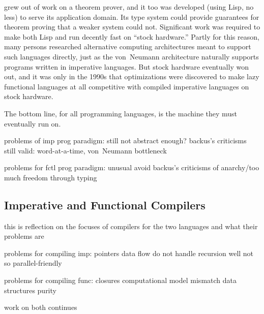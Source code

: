 \ML grew out of work on a theorem prover, and it too was developed (using Lisp, no less) to serve its application domain. Its type system could provide guarantees for theorem proving that a weaker system could not. Significant work was required to make both Lisp and \ML run decently fast on ``stock hardware.'' Partly for this reason, many persons researched alternative computing architectures meant to support such languages directly, just as the von~Neumann architecture naturally supports programs written in imperative languages. But stock hardware eventually won out, and it was only in the 1990s that optimizations were discovered to make lazy functional languages at all competitive with compiled imperative languages on stock hardware.

The bottom line, for all programming languages, is the machine they must eventually run on. 

problems of imp prog paradigm:
still not abstract enough?
backus's criticisms still valid: word-at-a-time, von~Neumann bottleneck

problems for fctl prog paradigm:
unusual
avoid backus's criticisms of anarchy/too much freedom through typing

\subsection*{Imperative and Functional Compilers}
this is reflection on the focuses of compilers for the two languages and what their problems are

problems for compiling imp:
pointers
data flow
do not handle recursion well
not so parallel-friendly

problems for compiling func:
closures
computational model mismatch
data structures
purity

work on both continues